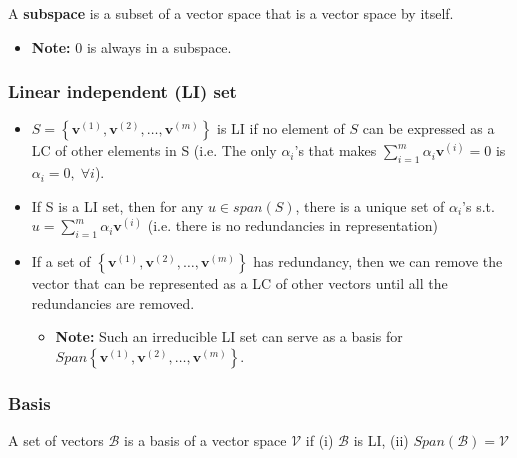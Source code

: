 \documentclass{article}
\begin{document}
        \begin{definition}
            A \textbf{subspace} is a subset of a vector space that is a vector space by itself.
            \begin{itemize}
                \item \textbf{Note:} $0$ is always in a subspace.
            \end{itemize}
        \end{definition}

    \subsubsection{Linear independent (LI) set}
        \begin{definition}
            \begin{itemize}
                \item \( S = \left\{\mathbf{v}^{(1)}, \mathbf{v}^{(2)}, \ldots, \mathbf{v}^{(m)}\right\} \) is LI if no element of $S$ can be expressed as a LC of other elements in S (i.e. The only $\alpha_i$'s that makes $\sum_{i=1}^{m} \alpha_i \mathbf{v}^{(i)} = 0$ is $\alpha_i = 0, \; \forall i$).
                \item If S is a LI set, then for any $u\in span(S)$, there is a unique set of $\alpha_i$'s s.t. $u=\sum_{i=1}^{m} \alpha_i \mathbf{v}^{(i)}$ (i.e. there is no redundancies in representation)
                \item If a set of $\left\{\mathbf{v}^{(1)}, \mathbf{v}^{(2)}, \ldots, \mathbf{v}^{(m)}\right\}$ has redundancy, then we can remove the vector that can be represented as a LC of other vectors until all the redundancies are removed.
                \begin{itemize}
                    \item \textbf{Note:} Such an irreducible LI set can serve as a basis for $Span\left\{\mathbf{v}^{(1)}, \mathbf{v}^{(2)}, \ldots, \mathbf{v}^{(m)}\right\}$.
                \end{itemize}
            \end{itemize}
        \end{definition}

    \subsubsection{Basis}
        \begin{definition}
            A set of vectors $\mathcal{B}$ is a basis of a vector space $\mathcal{V}$ if (i) $\mathcal{B}$ is LI, (ii) $Span(\mathcal{B})=\mathcal{V}$
        \end{definition}
\end{document}
